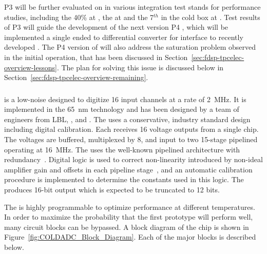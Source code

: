 P3   will be further evaluated on  
in various integration test stands for performance studies, including 
the \num{40}\%  at , the   
at  and the \num{7}$^{th}$   
in the cold box at . Test results of P3   
will guide the development of the next version P4  , 
which will be implemented a single ended to differential converter for 
interface to recently developed . The P4 version of 
 will also address the saturation problem observed in
the  initial operation, that has been discussed in 
Section~\ref{sec:fdsp-tpcelec-overview-lessons}. The plan for solving
this issue is discussed below in Section~\ref{sec:fdsp-tpcelec-overview-remaining}.

\subsubsection{ }
\label{sec:fdsp-tpcelec-design-femb-adc}

 is a low-noise   designed to digitize
\num{16} input channels at a rate of \SI{2}{MHz}. It is implemented in the 
\SI{65}{nm}  technology and has been designed by a team of engineers
from LBL, , and .  The  uses a conservative,
industry standard design including digital calibration.  Each 
receives \num{16} voltage outputs from a single  chip.  The voltages
are buffered, multiplexed by \num{8}, and input to two \num{15}-stage pipelined 
operating at \SI{16}{MHz}.  The  uses the well-known pipelined architecture
with redundancy~\cite{PipelinedADC}.  Digital logic is used to correct non-linearity
introduced by non-ideal amplifier gain and offsets in each pipeline
stage~\cite{CalibrationCorrection}, and an automatic calibration procedure is
implemented to determine the constants used in this logic.  The  produces
\num{16}-bit output which is expected to be truncated to \num{12} bits.

The  is highly programmable to optimize performance at different
temperatures.  In order to maximize the probability that the first prototype
 will perform well, many circuit blocks can be bypassed. A block
diagram of the chip is shown in Figure~\ref{fig:COLDADC_Block_Diagram}. Each of
the major blocks is described below.

